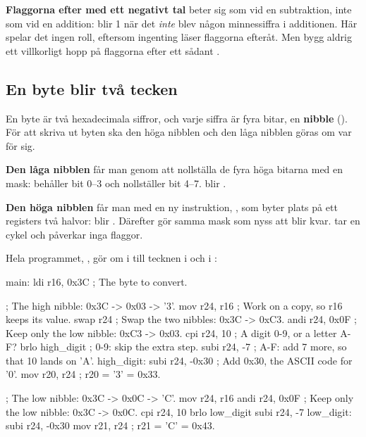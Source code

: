 \begin{aside}
\textbf{Flaggorna efter  med ett negativt tal} beter sig som vid en subtraktion, inte
som vid en addition:  blir 1 när det \emph{inte} blev någon minnessiffra i additionen. Här
spelar det ingen roll, eftersom ingenting läser flaggorna efteråt. Men bygg aldrig ett villkorligt
hopp på flaggorna efter ett sådant .
\end{aside}

\subsection{En byte blir två tecken}
\label{c10:a3}
En byte är två hexadecimala siffror, och varje siffra är fyra bitar, en \textbf{nibble}
(). För att skriva ut byten  ska den höga nibblen  och den låga
nibblen  göras om var för sig.


\textbf{Den låga nibblen} får man genom att nollställa de fyra höga bitarna med en mask:
 behåller bit 0--3 och nollställer bit 4--7.  blir .

\textbf{Den höga nibblen} får man med en ny instruktion, \textbf{}, som byter plats på
ett registers två halvor:  blir . Därefter gör samma mask som nyss att
 blir kvar.  tar en cykel och påverkar inga flaggor.

Hela programmet, , gör om  i  till tecknen  i
 och  i :

\begin{asmcode}
main:
    ldi r16, 0x3C                   ; The byte to convert.

    ; The high nibble: 0x3C -> 0x03 -> '3'.
    mov r24, r16                    ; Work on a copy, so r16 keeps its value.
    swap r24                        ; Swap the two nibbles: 0x3C -> 0xC3.
    andi r24, 0x0F                  ; Keep only the low nibble: 0xC3 -> 0x03.
    cpi r24, 10                     ; A digit 0-9, or a letter A-F?
    brlo high_digit                 ; 0-9: skip the extra step.
    subi r24, -7                    ; A-F: add 7 more, so that 10 lands on 'A'.
high_digit:
    subi r24, -0x30                 ; Add 0x30, the ASCII code for '0'.
    mov r20, r24                    ; r20 = '3' = 0x33.

    ; The low nibble: 0x3C -> 0x0C -> 'C'.
    mov r24, r16
    andi r24, 0x0F                  ; Keep only the low nibble: 0x3C -> 0x0C.
    cpi r24, 10
    brlo low_digit
    subi r24, -7
low_digit:
    subi r24, -0x30
    mov r21, r24                    ; r21 = 'C' = 0x43.
\end{asmcode}


